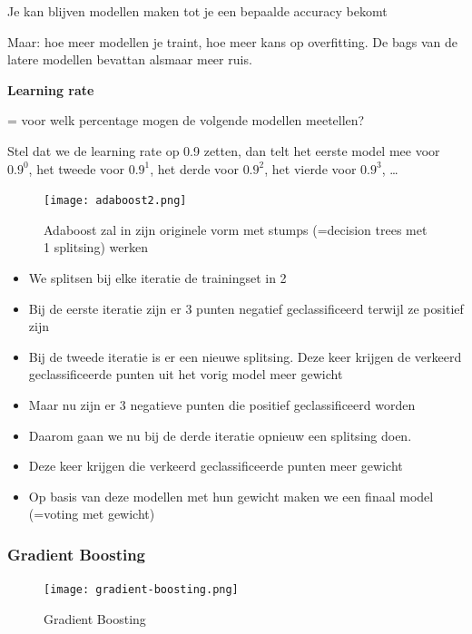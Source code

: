 \documentclass{article}
\begin{document}
Je kan blijven modellen maken tot je een bepaalde accuracy bekomt

Maar: hoe meer modellen je traint, hoe meer kans op overfitting. De bags van de latere modellen bevattan alsmaar meer ruis.

\textbf{Learning rate}

= voor welk percentage mogen de volgende modellen meetellen?

Stel dat we de learning rate op 0.9 zetten, dan telt het eerste model mee voor $0.9^0$, 
het tweede voor $0.9^1$, het derde voor $0.9^2$, het vierde voor $0.9^3$, \dots


\begin{figure}[H]
    \centering
    \texttt{[image: adaboost2.png]}
    \caption{Adaboost zal in zijn originele vorm met stumps (=decision trees met 1 splitsing) werken}
\end{figure}

\begin{itemize}
    \item We splitsen bij elke iteratie de trainingset in 2
    \item Bij de eerste iteratie zijn er 3 punten negatief geclassificeerd terwijl ze positief zijn
    \item Bij de tweede iteratie is er een nieuwe splitsing. Deze keer krijgen de verkeerd geclassificeerde punten uit het vorig model meer gewicht
    \item Maar nu zijn er 3 negatieve punten die positief geclassificeerd worden
    \item Daarom gaan we nu bij de derde iteratie opnieuw een splitsing doen.
    \item Deze keer krijgen die verkeerd geclassificeerde punten meer gewicht
    \item Op basis van deze modellen met hun gewicht maken we een finaal model (=voting met gewicht)
\end{itemize}

\subsubsection{Gradient Boosting}

\begin{figure}[H]
    \centering
    \texttt{[image: gradient-boosting.png]}
    \caption{Gradient Boosting}
\end{figure}
\end{document}
